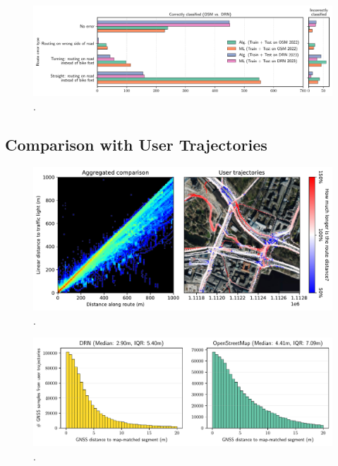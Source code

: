 \begin{figure}[htbp]
\centering 
\includegraphics[width=\linewidth]{images/matching-route-errors-osm-vs-drn.pdf}
\caption{.}
\label{fig:}
\end{figure}

\subsection{Comparison with User Trajectories}

\begin{figure}[htbp]
\centering 
\includegraphics[width=\linewidth]{images/routing-distance-analysis.pdf}
\caption{.}
\label{fig:}
\end{figure}


\begin{figure}[htbp]
\centering 
\includegraphics[width=\linewidth]{images/routing-gnss-mapmatching-distribution.pdf}
\caption{.}
\label{fig:}
\end{figure}


